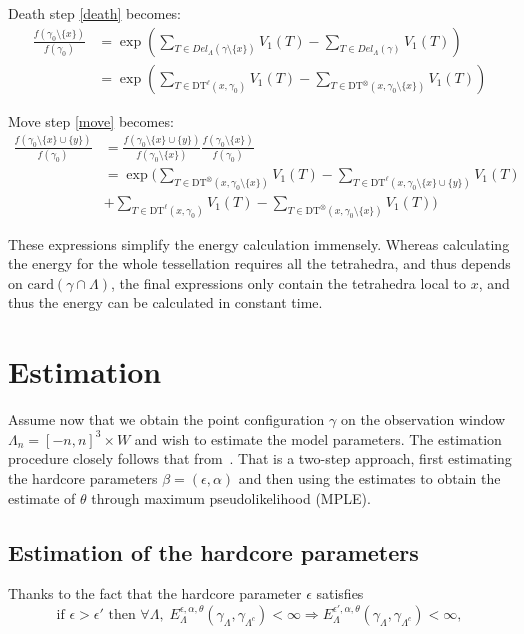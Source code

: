 \documentclass[12pt,a4paper]{report}
\begin{document}
Death step \ref{death} becomes:
\begin{align*}
\frac{f(\gamma_0 \setminus \{x\})}{f(\gamma_0)}&= \exp\left({\sum_{T\in Del_\Lambda(\gamma \setminus \{x\})} V_1(T)- \sum_{T \in Del_\Lambda(\gamma)}V_1(T)}\right)\\
&= \exp\left( \sum_{T\in \text{DT}^\ell (x,\gamma_0)} V_1(T) - \sum_{T \in \text{DT}^\otimes (x,\gamma_0 \setminus \{x\})} V_1(T)   \right)
\end{align*}

Move step \ref{move} becomes:
\begin{align*}
\frac{f(\gamma_0 \setminus \{x\} \cup \{y\})}{f(\gamma_0)}&= 
\frac{f(\gamma_0 \setminus \{x\} \cup \{y\})}{f(\gamma_0\setminus\{x\})} \frac{f(\gamma_0\setminus\{x\})}{f(\gamma_0)} \\ 
&= \exp \Bigg(  \sum_{T \in \text{DT}^\otimes (x,\gamma_0\setminus\{x\})} V_1(T)  - \sum_{T\in \text{DT}^\ell (x,\gamma_0\setminus\{x\}\cup\{y\})} V_1(T)  \\
&+ \sum_{T\in \text{DT}^\ell (x,\gamma_0)} V_1(T) - \sum_{T \in \text{DT}^\otimes (x,\gamma_0\setminus\{x\})} V_1(T)   
\Bigg)
\end{align*}



These expressions simplify the energy calculation immensely. Whereas calculating the energy for the whole tessellation requires all the tetrahedra, and thus depends on $\text{card}(\gamma\cap\Lambda)$, the final expressions only contain the tetrahedra local to $x$, and thus the energy can be calculated in constant time.



\section{Estimation}

Assume now that we obtain the point configuration $\gamma$ on the observation window $\Lambda_n = [-n,n]^3\times W$ and wish to estimate the model parameters.
The estimation procedure closely follows that from~\cite{DL10}. That is a two-step approach, first estimating the hardcore parameters $\beta = (\epsilon,\alpha)$ and then using the estimates to obtain the estimate of $\theta$ through maximum pseudolikelihood (MPLE). 
\subsection{Estimation of the hardcore parameters}
Thanks to the fact that the hardcore parameter $\epsilon$ satisfies
$$ \text{if } \epsilon > \epsilon' \text{ then  } \forall \Lambda, \; E^{\epsilon, \alpha,\theta}_\Lambda(\gamma_\Lambda,\gamma_{\Lambda^c}) < \infty \Rightarrow  E^{\epsilon',\alpha,\theta}_\Lambda(\gamma_\Lambda,\gamma_{\Lambda^c})<\infty,$$ 
\end{document}
